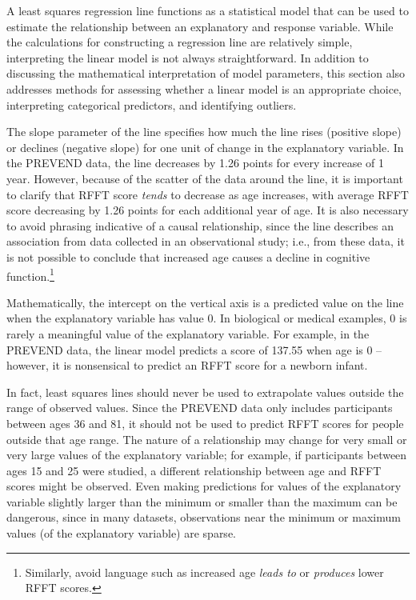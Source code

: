 A least squares regression line functions as a statistical model that can be used to estimate the relationship between an explanatory and response variable. While the calculations for constructing a regression line are relatively simple, interpreting the linear model is not always straightforward. In addition to discussing the mathematical interpretation of model parameters, this section also addresses methods for assessing whether a linear model is an appropriate choice, interpreting categorical predictors, and identifying outliers.

The slope parameter of the line specifies how much the line rises (positive slope) or declines (negative slope) for one unit of change in the explanatory variable. In the PREVEND data, the line decreases by 1.26 points for every increase of 1 year. However, because of the scatter of the data around the line, it is important to clarify that RFFT score \textit{tends} to decrease as age increases, with average RFFT score decreasing by 1.26 points for each additional year of age. It is also necessary to avoid phrasing indicative of a causal relationship, since the line describes an association from data collected in an observational study; i.e., from these data, it is not possible to conclude that increased age causes a decline in cognitive function.\footnote{Similarly, avoid language such as increased age \textit{leads to} or \textit{produces} lower RFFT scores.} 

Mathematically, the intercept on the vertical axis is a predicted value on the line when the explanatory variable has value 0. In biological or medical examples, 0 is rarely a meaningful value of the explanatory variable. For example, in the PREVEND data, the linear model predicts a score of 137.55 when age is 0 -- however, it is nonsensical to predict an RFFT score for a newborn infant. 

In fact, least squares lines should never be used to extrapolate values outside the range of observed values. Since the PREVEND data only includes participants between ages 36 and 81, it should not be used to predict RFFT scores for people outside that age range. The nature of a relationship may change for very small or very large values of the explanatory variable; for example, if participants between ages 15 and 25 were studied, a different relationship between age and RFFT scores might be observed. Even making predictions for values of the explanatory variable slightly larger than the minimum or smaller than the maximum can be dangerous, since in many datasets, observations near the minimum or maximum values (of the explanatory variable) are sparse.

